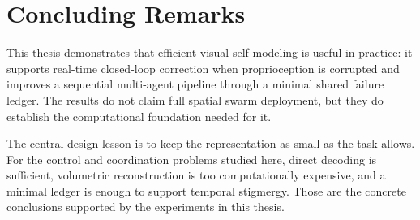 \documentclass[12pt,a4paper,oneside]{report}
\begin{document}
\section{Concluding Remarks}

This thesis demonstrates that efficient visual self-modeling is useful in practice: it supports real-time closed-loop correction when proprioception is corrupted and improves a sequential multi-agent pipeline through a minimal shared failure ledger. The results do not claim full spatial swarm deployment, but they do establish the computational foundation needed for it.

The central design lesson is to keep the representation as small as the task allows. For the control and coordination problems studied here, direct decoding is sufficient, volumetric reconstruction is too computationally expensive, and a minimal ledger is enough to support temporal stigmergy. Those are the concrete conclusions supported by the experiments in this thesis.

\clearpage
\end{document}
